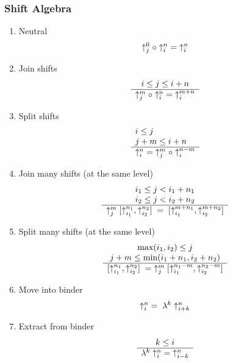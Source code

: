 \subsubsection{Shift Algebra}

\begin{enumerate}

    \item Neutral
        $$
        \uparrow^{0}_{j} \circ \uparrow^{n}_{i}
        \;=\;
        \uparrow^{n}_{i}
        $$


    \item Join shifts
        $$
            \begin{array}{c} 
                i \le j \le i + n
             \\ \hline 
                \uparrow^{m}_{j} \circ \uparrow^{n}_{i}
                \;=\;
                \uparrow^{m + n}_{i}
             \end{array}
        $$


    \item Split shifts
        $$
            \begin{array}{l} 
                i \le j
                \\
                j + m \le i + n
             \\ \hline 
                \uparrow^{n}_{i} \;=\; \uparrow^{m}_{j} \circ \uparrow^{n  - m}_{i}
             \end{array}
        $$


    \item Join many shifts (at the same level)
        $$
        \begin{array}{c} 
            i_1 \le j < i_1 + n_1
            \\
            i_2 \le j < i_2 + n_2
         \\ \hline 
            \uparrow^{m}_{j} [\uparrow^{n_1}_{i_1}, \uparrow^{n_2}_{i_2}]
            \;=\;
            [\uparrow^{m + n_1}_{i_1}, \uparrow^{m + n_2}_{i_2}]
         \end{array}
        $$


    \item Split many shifts (at the same level)
        $$
        \begin{array}{c} 
            \text{max}(i_1, i_2) \le j
            \\
            j + m \le \text{min}(i_1 + n_1, i_2 + n_2)
         \\ \hline 
            [\uparrow^{n_1}_{i_1}, \uparrow^{n_2}_{i_2}]
            \;=\;
            \uparrow^{m}_{j} [
                \uparrow^{n_1 - m}_{i_1},
                \uparrow^{n_2 - m}_{i_2}
            ]
         \end{array}
        $$


    \item Move into binder
        $$
        \uparrow^{n}_{i}  \;=\; \lambda^k \uparrow^{n}_{i + k}
        $$


    \item Extract from binder
        $$
        \begin{array}{c} 
            k \le i
         \\ \hline 
            \lambda^k \uparrow^{n}_{i} \;=\; \uparrow^{n}_{i - k}
         \end{array}
        $$
\end{enumerate}





